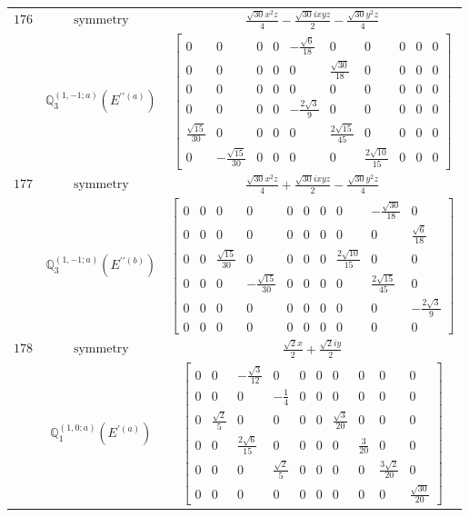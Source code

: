 \documentclass[fleqn,8pt,landscape]{jsarticle}
\begin{document}
\begin{longtable}{ccc}
$ 176 $ & $ \text{symmetry} $ & $ \frac{\sqrt{30} x^{2} z}{4} - \frac{\sqrt{30} i x y z}{2} - \frac{\sqrt{30} y^{2} z}{4} $ \\
$  $ & $ \mathbb{Q}_{3}^{(1,-1;a)}(E^{\prime\prime(a)}) $ & $ \begin{bmatrix} 0 & 0 & 0 & 0 & - \frac{\sqrt{6}}{18} & 0 & 0 & 0 & 0 & 0 \\ 0 & 0 & 0 & 0 & 0 & \frac{\sqrt{30}}{18} & 0 & 0 & 0 & 0 \\ 0 & 0 & 0 & 0 & 0 & 0 & 0 & 0 & 0 & 0 \\ 0 & 0 & 0 & 0 & - \frac{2 \sqrt{3}}{9} & 0 & 0 & 0 & 0 & 0 \\ \frac{\sqrt{15}}{30} & 0 & 0 & 0 & 0 & \frac{2 \sqrt{15}}{45} & 0 & 0 & 0 & 0 \\ 0 & - \frac{\sqrt{15}}{30} & 0 & 0 & 0 & 0 & \frac{2 \sqrt{10}}{15} & 0 & 0 & 0 \end{bmatrix} $ \\ \hline
$ 177 $ & $ \text{symmetry} $ & $ \frac{\sqrt{30} x^{2} z}{4} + \frac{\sqrt{30} i x y z}{2} - \frac{\sqrt{30} y^{2} z}{4} $ \\
$  $ & $ \mathbb{Q}_{3}^{(1,-1;a)}(E^{\prime\prime(b)}) $ & $ \begin{bmatrix} 0 & 0 & 0 & 0 & 0 & 0 & 0 & 0 & - \frac{\sqrt{30}}{18} & 0 \\ 0 & 0 & 0 & 0 & 0 & 0 & 0 & 0 & 0 & \frac{\sqrt{6}}{18} \\ 0 & 0 & \frac{\sqrt{15}}{30} & 0 & 0 & 0 & 0 & \frac{2 \sqrt{10}}{15} & 0 & 0 \\ 0 & 0 & 0 & - \frac{\sqrt{15}}{30} & 0 & 0 & 0 & 0 & \frac{2 \sqrt{15}}{45} & 0 \\ 0 & 0 & 0 & 0 & 0 & 0 & 0 & 0 & 0 & - \frac{2 \sqrt{3}}{9} \\ 0 & 0 & 0 & 0 & 0 & 0 & 0 & 0 & 0 & 0 \end{bmatrix} $ \\ \hline
$ 178 $ & $ \text{symmetry} $ & $ \frac{\sqrt{2} x}{2} + \frac{\sqrt{2} i y}{2} $ \\
$  $ & $ \mathbb{Q}_{1}^{(1,0;a)}(E^{\prime(a)}) $ & $ \begin{bmatrix} 0 & 0 & - \frac{\sqrt{3}}{12} & 0 & 0 & 0 & 0 & 0 & 0 & 0 \\ 0 & 0 & 0 & - \frac{1}{4} & 0 & 0 & 0 & 0 & 0 & 0 \\ 0 & \frac{\sqrt{2}}{5} & 0 & 0 & 0 & 0 & \frac{\sqrt{3}}{20} & 0 & 0 & 0 \\ 0 & 0 & \frac{2 \sqrt{6}}{15} & 0 & 0 & 0 & 0 & \frac{3}{20} & 0 & 0 \\ 0 & 0 & 0 & \frac{\sqrt{2}}{5} & 0 & 0 & 0 & 0 & \frac{3 \sqrt{2}}{20} & 0 \\ 0 & 0 & 0 & 0 & 0 & 0 & 0 & 0 & 0 & \frac{\sqrt{30}}{20} \end{bmatrix} $ \\ \hline

\end{longtable}
\end{document}
